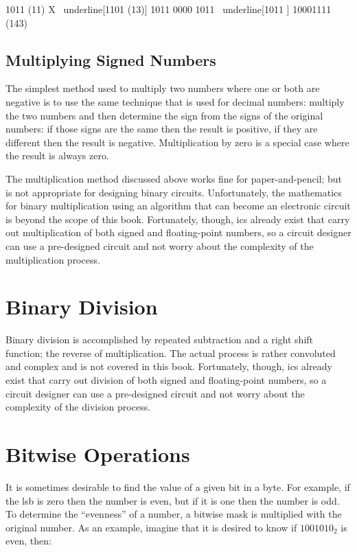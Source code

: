 \begin{binDisp}[commandchars=~\[\]]
        1011  (11)
      X ~underline[1101  (13)]
        1011
       0000
      1011
     ~underline[1011          ]
    10001111  (143)
\end{binDisp}

\subsection{Multiplying Signed Numbers}
\label{MO:sub:multiplying_signed_numbers}

The simplest method used to multiply two numbers where one or both are negative is to use the same technique that is used for decimal numbers: multiply the two numbers and then determine the sign from the signs of the original numbers: if those signs are the same then the result is positive, if they are different then the result is negative. Multiplication by zero is a special case where the result is always zero.

The multiplication method discussed above works fine for paper-and-pencil; but is not appropriate for designing binary circuits. Unfortunately, the mathematics for binary multiplication using an algorithm that can become an electronic circuit is beyond the scope of this book. Fortunately, though, \glspl{ic} already exist that carry out multiplication of both signed and floating-point numbers, so a circuit designer can use a pre-designed circuit and not worry about the complexity of the multiplication process.

\section{Binary Division}
\label{MO:sec:binary_division}

Binary division is accomplished by repeated subtraction and a right shift function; the reverse of multiplication. The actual process is rather convoluted and complex and is not covered in this book. Fortunately, though, \glspl{ic} already exist that carry out division of both signed and floating-point numbers, so a circuit designer can use a pre-designed circuit and not worry about the complexity of the division process.

\section{Bitwise Operations}
\label{MO:sec:bitwise_operations}

It is sometimes desirable to find the value of a given bit in a byte. For example, if the \gls{lsb} is zero then the number is even, but if it is one then the number is odd. To determine the ``evenness'' of a number, a bitwise mask is multiplied with the original number. As an example, imagine that it is desired to know if $ 1001010_2 $ is even, then:

